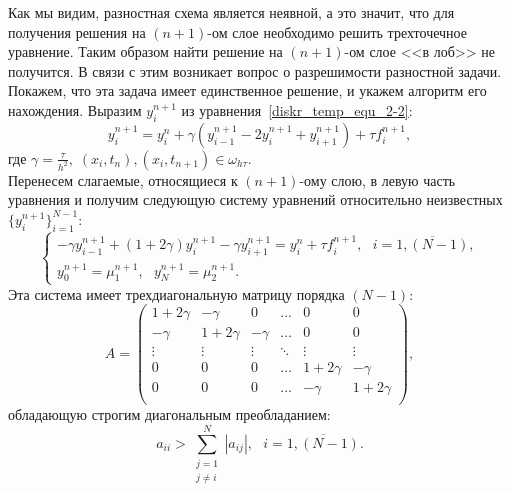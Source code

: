 \documentclass[11pt,a4paper,twoside]{report}
\numberwithin{equation}{section}
\theoremstyle{definition}
\theoremstyle{plain}
\begin{document}
\begin{figure}[H]
\centering
{}
\end{figure}
%
Как мы видим, разностная схема является неявной, а это значит, что для получения
решения на
$(n+1)$-ом слое необходимо решить трехточечное уравнение. Таким образом найти решение
на $(n+1)$-ом слое <<в лоб>> не получится. В связи с этим возникает вопрос о
разрешимости разностной задачи.
Покажем, что эта задача имеет единственное решение, и укажем алгоритм его нахождения.
Выразим $y_i^{n+1}$ из уравнения~\eqref{diskr_temp_equ_2-2}:
%
$$
    y_i^{n+1} = y_i^n + \gamma\left(y_{i-1}^{n+1} - 2y_i^{n+1} + y_{i+1}^{n+1}\right) +
    \tau f_i^{n+1},
$$
%
где $\gamma = \frac{\tau}{h^2},\;(x_i, t_n), (x_i, t_{n+1})\in \omega_{h \tau}$.\\
Перенесем слагаемые, относящиеся к $(n+1)$-ому слою, в левую часть уравнения и получим следующую
систему уравнений относительно неизвестных $\{y_i^{n+1}\}_{i=1}^{N-1}$:
%
$$
    \begin{cases}
        -\gamma y_{i-1}^{n+1} + \left(1 + 2\gamma\right) y_i^{n+1} - \gamma y_{i+1}^{n+1} =
        y_i^n + \tau f_i^{n+1}, ~~~i = \overline{1,(N - 1)}, \\
        y_0^{n+1} = \mu_1^{n+1}, ~~~y_N^{n+1} = \mu_2^{n+1}.
    \end{cases}
$$
%
Эта система имеет трехдиагональную матрицу порядка $(N-1)$:
%
$$
    A =
    \begin{pmatrix}
      1 + 2\gamma & -\gamma & 0 & \dots & 0 & 0 \\
      -\gamma & 1 + 2\gamma & -\gamma & \dots & 0 & 0\\
      \vdots & \vdots & \vdots & \ddots & \vdots & \vdots\\
      0 & 0  & 0 & \dots & 1 + 2\gamma & -\gamma \\
      0 & 0  & 0 & \dots & -\gamma & 1 + 2\gamma  \\
    \end{pmatrix},
$$
%
обладающую строгим диагональным преобладанием:
%
$$
    a_{ii} > \sum \limits_{\substack{j=1\\j\ne i}}^N\left|a_{ij}\right|, ~~~i=\overline{1, (N-1)}.
$$
%
\end{document}
